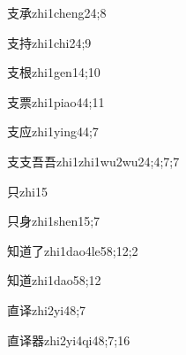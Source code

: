 \begin{verbete}{支承}{zhi1cheng2}{4;8}
\end{verbete}

\begin{verbete}{支持}{zhi1chi2}{4;9}
\end{verbete}

\begin{verbete}{支根}{zhi1gen1}{4;10}
\end{verbete}

\begin{verbete}{支票}{zhi1piao4}{4;11}
\end{verbete}

\begin{verbete}{支应}{zhi1ying4}{4;7}
\end{verbete}

\begin{verbete}{支支吾吾}{zhi1zhi1wu2wu2}{4;4;7;7}
\end{verbete}

\begin{verbete}{只}{zhi1}{5}
\end{verbete}

\begin{verbete}{只身}{zhi1shen1}{5;7}
\end{verbete}

\begin{verbete}{知道了}{zhi1dao4le5}{8;12;2}
\end{verbete}

\begin{verbete}{知道}{zhi1dao5}{8;12}
\end{verbete}

\begin{verbete}{直译}{zhi2yi4}{8;7}
\end{verbete}

\begin{verbete}{直译器}{zhi2yi4qi4}{8;7;16}
\end{verbete}

